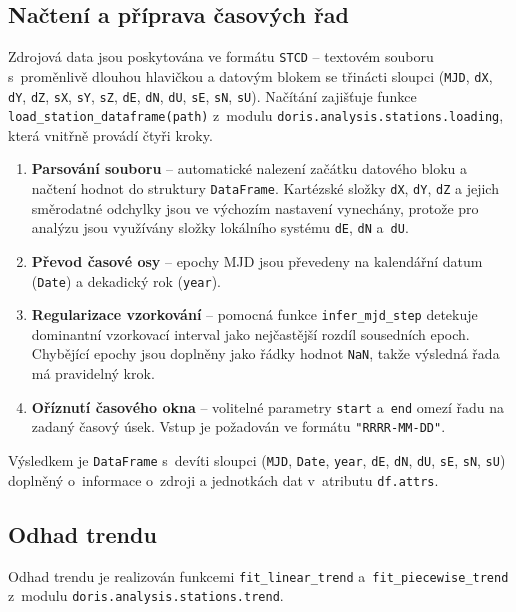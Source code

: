 \subsection{Načtení a příprava časových řad}

Zdrojová data jsou poskytována ve formátu \texttt{STCD} -- textovém souboru s~proměnlivě dlouhou hlavičkou a datovým blokem se třinácti sloupci (\texttt{MJD}, \texttt{dX}, \texttt{dY}, \texttt{dZ}, \texttt{sX}, \texttt{sY}, \texttt{sZ}, \texttt{dE}, \texttt{dN}, \texttt{dU}, \texttt{sE}, \texttt{sN}, \texttt{sU}). Načítání zajišťuje funkce \texttt{load\_station\_dataframe(path)} z~modulu \texttt{doris.analysis.stations.loading}, která vnitřně provádí čtyři kroky.

\begin{enumerate}
    \item \textbf{Parsování souboru} -- automatické nalezení začátku datového bloku a načtení hodnot do struktury \texttt{DataFrame}. Kartézské složky \texttt{dX}, \texttt{dY}, \texttt{dZ} a jejich směrodatné odchylky jsou ve výchozím nastavení vynechány, protože pro analýzu jsou využívány složky lokálního systému \texttt{dE}, \texttt{dN} a~\texttt{dU}.

    \item \textbf{Převod časové osy} -- epochy MJD jsou převedeny na kalendářní datum (\texttt{Date}) a dekadický rok (\texttt{year}).

    \item \textbf{Regularizace vzorkování} -- pomocná funkce \texttt{infer\_mjd\_step} detekuje dominantní vzorkovací interval jako nejčastější rozdíl sousedních epoch. Chybějící epochy jsou doplněny jako řádky hodnot \texttt{NaN}, takže výsledná řada má pravidelný krok.

    \item \textbf{Oříznutí časového okna} -- volitelné parametry \texttt{start} a~\texttt{end} omezí řadu na zadaný časový úsek. Vstup je požadován ve formátu \texttt{"RRRR-MM-DD"}.
\end{enumerate}

Výsledkem je \texttt{DataFrame} s~devíti sloupci (\texttt{MJD}, \texttt{Date}, \texttt{year}, \texttt{dE}, \texttt{dN}, \texttt{dU}, \texttt{sE}, \texttt{sN}, \texttt{sU}) doplněný o~informace o~zdroji a jednotkách dat v~atributu \texttt{df.attrs}.

\subsection{Odhad trendu}
Odhad trendu je realizován funkcemi \texttt{fit\_linear\_trend} a~\texttt{fit\_piecewise\_trend} z~modulu \texttt{doris.analysis.stations.trend}. 

